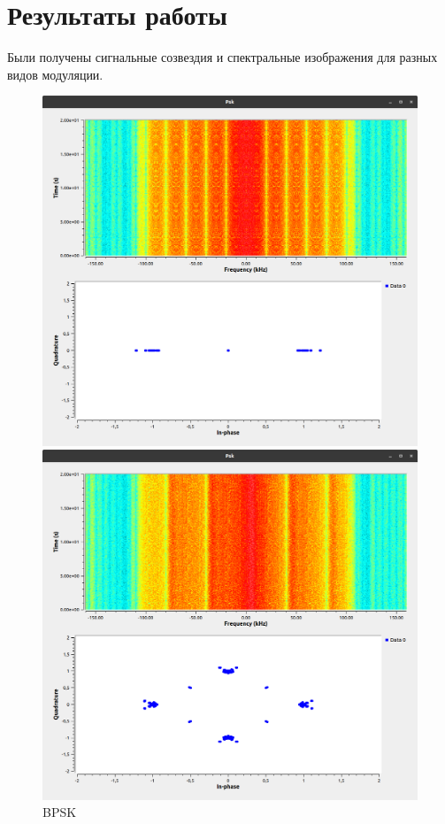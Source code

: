 \newpage
\section{Результаты работы}
Были получены сигнальные созвездия и спектральные изображения для разных видов модуляции.

\begin{figure}[!htb]
	\includegraphics[width=\linewidth]{pics/BPSK}
	\caption{BPSK}\label{fig:BPSK}
	\endminipage\hfill
	\includegraphics[width=\linewidth]{pics/QPSK}

\end{figure}
